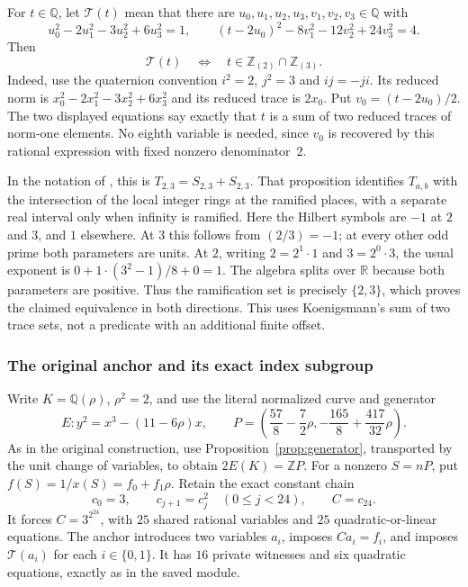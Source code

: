 For $t\in\mathbb Q$, let $\mathcal T(t)$ mean that there are
$u_0,u_1,u_2,u_3,v_1,v_2,v_3\in\mathbb Q$ with
\[
 u_0^2-2u_1^2-3u_2^2+6u_3^2=1,
 \qquad
 (t-2u_0)^2-8v_1^2-12v_2^2+24v_3^2=4.
\]
Then
\[
 \mathcal T(t)\quad\Longleftrightarrow\quad
 t\in\mathbb Z_{(2)}\cap\mathbb Z_{(3)}.
\]
Indeed, use the quaternion convention $i^2=2$, $j^2=3$ and $ij=-ji$.
Its reduced norm is $x_0^2-2x_1^2-3x_2^2+6x_3^2$ and its reduced trace
is $2x_0$. Put $v_0=(t-2u_0)/2$. The two displayed equations say
exactly that $t$ is a sum of two reduced traces of norm-one elements.
No eighth variable is needed, since $v_0$ is recovered by this rational
expression with fixed nonzero denominator~$2$.

In the notation of \cite[Definition~4 and Proposition~6]{koenigsmann-defining},
this is $T_{2,3}=S_{2,3}+S_{2,3}$. That proposition identifies
$T_{a,b}$ with the intersection of the local integer rings at the
ramified places, with a separate real interval only when infinity is
ramified. Here the Hilbert symbols are $-1$ at $2$ and $3$, and $1$
elsewhere. At $3$ this follows from $(2/3)=-1$; at every other odd
prime both parameters are units. At $2$, writing $2=2^1\cdot1$ and
$3=2^0\cdot3$, the usual exponent is
$0+1\cdot(3^2-1)/8+0=1$. The algebra splits over $\mathbb R$ because
both parameters are positive. Thus the ramification set is precisely
$\{2,3\}$, which proves the claimed equivalence in both directions.
This uses Koenigsmann's sum of two trace sets, not a predicate with
an additional finite offset.

\subsubsection{The original anchor and its exact index subgroup}\label{subsec:o8-anchor-subgroup}

Write $K=\mathbb Q(\rho)$, $\rho^2=2$, and use the literal normalized
curve and generator
\[
 E:y^2=x^3-(11-6\rho)x,
 \qquad
 P=\left(\frac{57}{8}-\frac72\rho,
          -\frac{165}{8}+\frac{417}{32}\rho\right).
\]
As in the original construction, use Proposition~\ref{prop:generator}, transported by the unit change
of variables, to obtain $2E(K)=\mathbb ZP$. For a nonzero $S=nP$, put
$f(S)=1/x(S)=f_0+f_1\rho$. Retain the exact constant chain
\[
 c_0=3,\qquad c_{j+1}=c_j^2\quad(0\le j<24),\qquad C=c_{24}.
\]
It forces $C=3^{2^{24}}$, with $25$ shared rational variables and
$25$ quadratic-or-linear equations. The anchor introduces two
variables $a_i$, imposes $Ca_i=f_i$, and imposes $\mathcal T(a_i)$
for each $i\in\{0,1\}$. It has $16$ private witnesses and six
quadratic equations, exactly as in the saved module.

